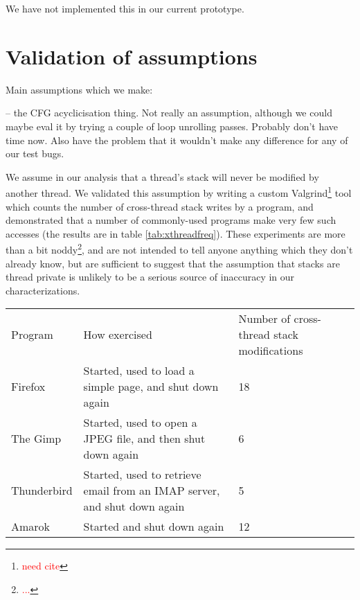 \documentclass[10pt,twocolumn,preprint,natbib,authoryear]{sigplanconf}
\newcommand{\editorial}[1]{\textcolor{red}{\footnote{\textcolor{red}{#1}}}}
\newcommand{\needCite}{\editorial{need cite}}
\begin{document}
We have not implemented this in our current prototype.

\section{Validation of assumptions}
\label{sect:validassumpt}

Main assumptions which we make:

-- the CFG acyclicisation thing.  Not really an assumption, although
we could maybe eval it by trying a couple of loop unrolling passes.
Probably don't have time now.  Also have the problem that it wouldn't
make any difference for any of our test bugs.

We assume in our analysis that a thread's stack will never be modified
by another thread.  We validated this assumption by writing a custom
Valgrind\needCite{} tool which counts the number of cross-thread stack
writes by a program, and demonstrated that a number of commonly-used
programs make very few such accesses (the results are in table
\ref{tab:xthreadfreq}).  These experiments are more than a bit
noddy\editorial{...}, and are not intended to tell anyone anything
which they don't already know, but are sufficient to suggest that the
assumption that stacks are thread private is unlikely to be a serious
source of inaccuracy in our characterizations.

\begin{table*}
\begin{tabular}{lll}
Program & How exercised & Number of cross-thread stack modifications \\
Firefox & Started, used to load a simple page, and shut down again & 18 \\
The Gimp & Started, used to open a JPEG file, and then shut down again & 6 \\
Thunderbird & Started, used to retrieve email from an IMAP server, and shut down again & 5\\
Amarok & Started and shut down again & 12
\end{tabular}
\caption{Frequency of cross-thread stack stores for some common applications}
\label{tab:xthreadfreq}
\end{table*}
\end{document}
